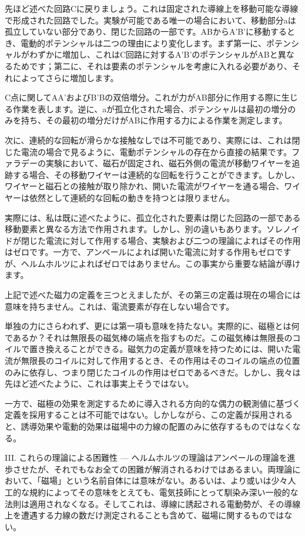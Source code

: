 \documentclass[a4paper,11pt,openany]{ltjsbook}
\begin{document}
先ほど述べた回路Cに戻りましょう。これは固定された導線上を移動可能な導線で形成された回路でした。実験が可能である唯一の場合において、移動部分aは孤立していない部分であり、閉じた回路の一部です。ABからA'B'に移動するとき、電動的ポテンシャルは二つの理由により変化します。まず第一に、ポテンシャルがわずかに増加し、これはC回路に対するA'B'のポテンシャルがABと異なるためです；第二に、それは要素のポテンシャルを考慮に入れる必要があり、それによってさらに増加します。


C点に関してAA'およびB'Bの双倍増分。これが力がAB部分に作用する際に生じる作業を表します。逆に、aが孤立化された場合、ポテンシャルは最初の増分のみを持ち、その最初の増分だけがABに作用する力による作業を測定します。

次に、連続的な回転が滑らかな接触なしでは不可能であり、実際には、これは閉じた電流の場合で見るように、電動ポテンシャルの存在から直接の結果です。ファラデーの実験において、磁石が固定され、磁石外側の電流が移動ワイヤーを追跡する場合、その移動ワイヤーは連続的な回転を行うことができます。しかし、ワイヤーと磁石との接触が取り除かれ、開いた電流がワイヤーを通る場合、ワイヤーは依然として連続的な回転の動きを持つとは限りません。

実際には、私は既に述べたように、孤立化された要素は閉じた回路の一部である移動要素と異なる方法で作用されます。しかし、別の違いもあります。ソレノイドが閉じた電流に対して作用する場合、実験および二つの理論によればその作用はゼロです。一方で、アンペールによれば開いた電流に対する作用もゼロですが、ヘルムホルツによればゼロではありません。この事実から重要な結論が導けます。

上記で述べた磁力の定義を三つとえましたが、その第三の定義は現在の場合には意味を持ちません。これは、電流要素が存在しない場合です。

単独の力にさらわれず、更には第一項も意味を持たない。実際的に、磁極とは何であるか？それは無限長の磁気棒の端点を指すものだ。この磁気棒は無限長のコイルで置き換えることができる。磁気力の定義が意味を持つためには、開いた電流が無限長のコイルに対して作用するとき、その作用はそのコイルの端点の位置のみに依存し、つまり閉じたコイルの作用はゼロであるべきだ。しかし、我々は先ほど述べたように、これは事実上そうではない。

一方で、磁極の効果を測定するために導入される方向的な偶力の観測値に基づく定義を採用することは不可能ではない。しかしながら、この定義が採用されると、誘導効果や電動的効果は磁場中の力線の配置のみに依存するものではなくなる。

III. これらの理論による困難性 — ヘルムホルツの理論はアンペールの理論を進歩させたが、それでもなお全ての困難が解消されるわけではあるまい。両理論において、「磁場」という名前自体には意味がない。あるいは、より或いは少々人工的な規約によってその意味をとえても、電気技師にとって馴染み深い一般的な法則は適用されなくなる。そしてこれは、導線に誘起される電動勢が、その導線上を遭遇する力線の数だけ測定されることも含めて、磁場に関するものではない。
\end{document}
